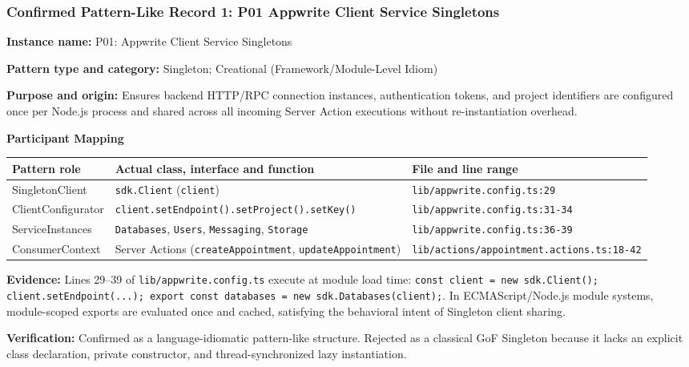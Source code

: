 \documentclass[11pt,a4paper]{article}
\newcommand{\entry}[2]{\textbf{#1:} #2\par}
\begin{document}
\subsubsection{Confirmed Pattern-Like Record 1: P01 Appwrite Client Service Singletons}
\entry{Instance name}{P01: Appwrite Client Service Singletons}
\entry{Pattern type and category}{Singleton; Creational (Framework/Module-Level Idiom)}
\entry{Purpose and origin}{Ensures backend HTTP/RPC connection instances, authentication tokens, and project identifiers are configured once per Node.js process and shared across all incoming Server Action executions without re-instantiation overhead.}
\textbf{Participant Mapping}\par
\begin{tabularx}{\linewidth}{@{}p{32mm}Xp{50mm}@{}}\toprule
Pattern role & Actual class, interface and function & File and line range\\\midrule
SingletonClient & \texttt{sdk.Client} (\texttt{client}) & \texttt{lib/appwrite.config.ts:29}\\
ClientConfigurator & \texttt{client.setEndpoint()}\allowbreak\texttt{.setProject()}\allowbreak\texttt{.setKey()} & \texttt{lib/appwrite.config.ts:31-34}\\
ServiceInstances & \texttt{Databases}, \texttt{Users}, \texttt{Messaging}, \texttt{Storage} & \texttt{lib/appwrite.config.ts:36-39}\\
ConsumerContext & Server Actions (\texttt{createAppointment}, \texttt{updateAppointment}) & \texttt{lib/actions/appointment.actions.ts:18-42}\\\bottomrule
\end{tabularx}
\entry{Evidence}{Lines 29--39 of \texttt{lib/appwrite.config.ts} execute at module load time: \texttt{const client = new sdk.Client(); client.setEndpoint(...); export const databases = new sdk.Databases(client);}. In ECMAScript/Node.js module systems, module-scoped exports are evaluated once and cached, satisfying the behavioral intent of Singleton client sharing.}
\entry{Verification}{Confirmed as a language-idiomatic pattern-like structure. Rejected as a classical GoF Singleton because it lacks an explicit class declaration, private constructor, and thread-synchronized lazy instantiation.}
\end{document}
